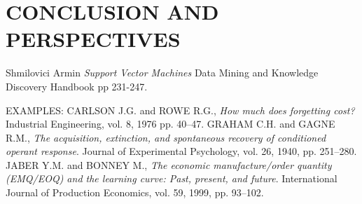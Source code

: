 \documentclass[11pt,a4paper]{article}
\begin{document}
\section{CONCLUSION AND PERSPECTIVES}




\begin{thebibliography}{99}
 \setlength\baselineskip{5pt}
%
 Shmilovici Armin \textit{Support Vector Machines} Data Mining and Knowledge Discovery Handbook pp 231-247.




EXAMPLES:
 CARLSON J.G. and ROWE R.G., \textit{How much does forgetting cost?} Industrial Engineering, vol. 8, 1976 pp. 40--47.
 GRAHAM C.H. and  GAGNE R.M., \textit{The acquisition, extinction, and spontaneous recovery of conditioned operant response}. Journal of Experimental Psychology, vol. 26, 1940, pp. 251--280.
 JABER Y.M. and BONNEY M., \textit{The economic manufacture/order quantity (EMQ/EOQ) and the learning curve: Past, present, and future}. International Journal of Production Economics, vol. 59, 1999, pp. 93--102.


\end{thebibliography}
\end{document}
